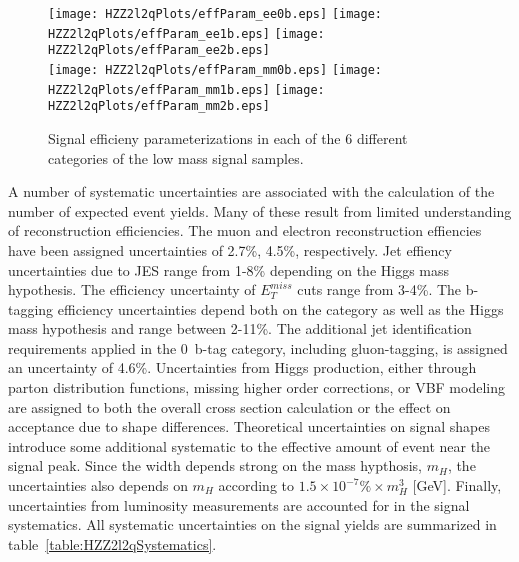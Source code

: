 \begin{figure}
\begin{center}
\texttt{[image: HZZ2l2qPlots/effParam\_ee0b.eps]}
\texttt{[image: HZZ2l2qPlots/effParam\_ee1b.eps]}
\texttt{[image: HZZ2l2qPlots/effParam\_ee2b.eps]}\\
\texttt{[image: HZZ2l2qPlots/effParam\_mm0b.eps]}
\texttt{[image: HZZ2l2qPlots/effParam\_mm1b.eps]}
\texttt{[image: HZZ2l2qPlots/effParam\_mm2b.eps]}

\caption{Signal efficieny parameterizations in each of the 6
different categories of the low mass signal samples.}
\label{fig:efficiencyLowMass}
\end{center}
\end{figure}

A number of systematic uncertainties are associated with the calculation
of the number of expected event yields.  Many of these result from
limited understanding of reconstruction efficiencies.  The 
muon and electron reconstruction effiencies have been assigned 
uncertainties of 2.7\%, 4.5\%, respectively.  Jet effiency
uncertainties due to JES range from 1-8\% depending on the Higgs
mass hypothesis.  The efficiency uncertainty of $E_T^{miss}$ cuts
range from 3-4\%.  The b-tagging efficiency uncertainties depend
both on the category as well as the Higgs mass hypothesis and
range between 2-11\%. 
The additional jet identification requirements applied in the 0~b-tag
category, including gluon-tagging, is assigned an uncertainty of 4.6\%.
Uncertainties from Higgs production, either through parton distribution
functions, missing higher order corrections, or VBF modeling are
assigned to both the overall cross section calculation or the
effect on acceptance due to shape differences.  Theoretical
uncertainties on signal shapes introduce some additional
systematic to the effective amount of event near the signal peak.
Since the width depends strong on the mass hypthosis, $m_H$,
the uncertainties also depends on $m_H$ according to
$1.5\times10^{-7}\%\times m_H^3$ [GeV].  Finally, uncertainties from
luminosity measurements are accounted for in the signal
systematics.  All systematic uncertainties on the signal yields
are summarized in table~\ref{table:HZZ2l2qSystematics}.

